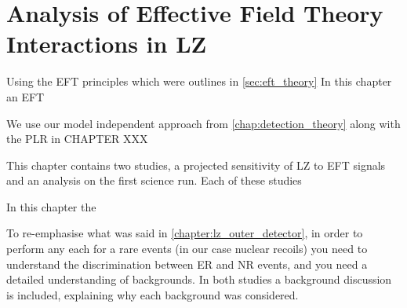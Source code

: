 \chapter{Analysis of Effective Field Theory Interactions in LZ}
\label{chap:analysis_eft_work}
Using the EFT principles which were outlines in \autoref{sec:eft_theory} In this chapter an EFT

We use our model independent approach from \autoref{chap:detection_theory} along with the PLR in CHAPTER XXX



\par
This chapter contains two studies, a projected sensitivity of LZ to EFT signals and an analysis on the first science run.
Each of these studies 

\par
In this chapter the 

\par
To re-emphasise what was said in \autoref{chapter:lz_outer_detector}, in order to perform any each for a rare events (in our case nuclear recoils) you need to understand the discrimination between ER and NR events, and you need a detailed understanding of backgrounds.
In both studies a background discussion is included, explaining why each background was considered.


%









%

%

